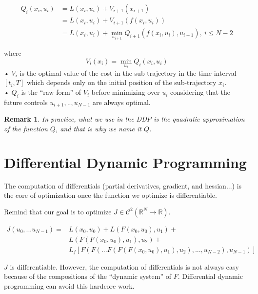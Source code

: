 \documentclass{report}
\newtheorem*{remark}{Remark}
\begin{document}
\begin{equation}
\begin{split}
Q_i(x_i,u_i) &= L(x_i,u_i) + V_{i+1}(x_{i+1}) \\
				&= L(x_i,u_i) + V_{i+1}(f(x_i,u_i)) \\
				&= L(x_i,u_i) + \min_{u_{i+1}} Q_{i+1}(f(x_i,u_i), u_{i+1}),\ i \le N-2
\end{split}
\end{equation}

where
\begin{equation}
V_i(x_i) = \min_{u_i} Q_i(x_i, u_i) 
\end{equation}•
$V_i$ is the optimal value of the cost in the sub-trajectory in the time interval $[t_i, T]$ which depends only on the initial position of the sub-trajectory $x_i$.
\\•
$Q_i$ is the ``raw form'' of $V_i$ before minimizing over $u_i$ considering that the future controls $u_{i+1}, .., u_{N-1}$ are always optimal. 

\begin{remark}
In practice, what we use in the DDP is the quadratic approximation of the function $Q$, and that is why we name it $Q$. 
\end{remark}

\chapter{Differential Dynamic Programming}

The computation of differentials (partial derivatives, gradient, and hessian...) is the core of optimization once the function we optimize is differentiable.

Remind that our goal is to optimize $J \in \mathscr{C}^2 (\mathbb{R}^N \to \mathbb{R})$.

\begin{equation}
\begin{split}
J(u_0, ...u_{N-1}) = &L(x_0, u_0) + L(F(x_0, u_0), u_1) + \\
	&L(F(F(x_0, u_0), u_1), u_2) + \\
	&L_f[F(F(...F(F(F(x_0, u_0), u_1), u_2), ..., u_{N-2}) ,u_{N-1})]
\end{split}
\end{equation}

$J$ is differentiable. However, the computation of differentials is not always easy because of the compositions of the ``dynamic system'' of $F$. Differential dynamic programming can avoid this hardcore work.
\end{document}
